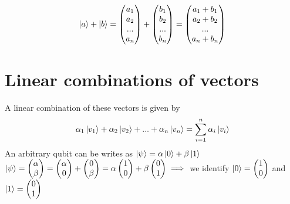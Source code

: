 \documentclass[12pt,oneside]{book}
\begin{document}
\[ \ket{a} + \ket{b} = \left( \begin{matrix}
            a_1 \\
            a_2 \\
            ... \\
            a_n
        \end{matrix}\right) + \left( \begin{matrix}
            b_1 \\
            b_2 \\
            ... \\
            b_n
        \end{matrix}\right) = \left( \begin{matrix}
            a_1 + b_1 \\
            a_2 + b_2 \\
            ...       \\
            a_n+b_n
        \end{matrix}\right)\]
\section{Linear combinations of vectors}
A linear combination of these vectors is given by
\[ \alpha_1\ket{v_1} + \alpha_2\ket{v_2} + ... + \alpha_n\ket{v_n} = \sum_{i=1}^n \alpha_i\ket{v_i} \]
An arbitrary qubit can be writes as $\ket{\psi} = \alpha\ket{0} + \beta\ket{1}$\\
$\ket{\psi} =  \left( \begin{matrix}
            \alpha \\
            \beta
        \end{matrix}\right) = \left( \begin{matrix}
            \alpha \\
            0
        \end{matrix}\right) + \left( \begin{matrix}
            0 \\
            \beta
        \end{matrix}\right) = \alpha \left( \begin{matrix}
            1 \\
            0
        \end{matrix}\right) + \beta\left( \begin{matrix}
            0 \\
            1
        \end{matrix}\right) \implies $ we identify $\ket{0} = \left( \begin{matrix}
            1 \\
            0
        \end{matrix}\right)$ and $\ket{1} = \left( \begin{matrix}
            0 \\
            1
        \end{matrix}\right)$
\end{document}
